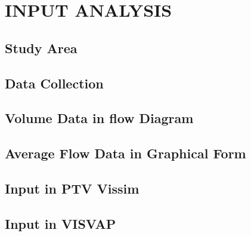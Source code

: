 \chapter{INPUT ANALYSIS}

\section{Study Area}
\section{Data Collection}
\section{Volume Data in flow Diagram}
\section{Average Flow Data in Graphical Form}
\section{Input in PTV Vissim}
\section{Input in VISVAP}